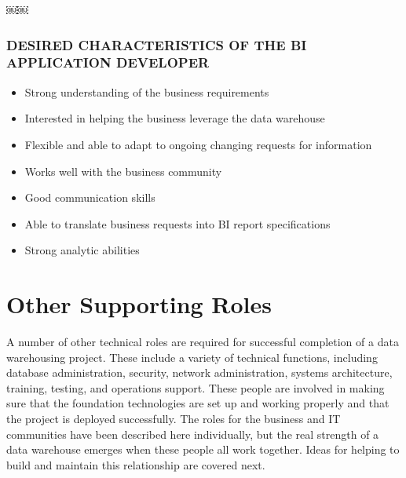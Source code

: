 \documentclass{vldb}
\newcommand{\bi}{\begin{itemize}}
\newcommand{\ei}{\end{itemize}}
\newcommand{\ii}{\item}
\begin{document}
￼￼\subsubsection*{DESIRED CHARACTERISTICS OF THE BI APPLICATION DEVELOPER}

\bi
\ii Strong understanding of the business requirements
\ii Interested in helping the business leverage the data warehouse
\ii Flexible and able to adapt to ongoing changing requests for information 
\ii Works well with the business community
\ii Good communication skills
\ii Able to translate business requests into BI report specifications
\ii Strong analytic abilities
\ei

\section{Other Supporting Roles}
A number of other technical roles are required for successful completion of a data warehousing project. These include a variety of technical functions, including database administration, security, network administration, systems architecture, training, testing, and operations support. These people are involved in making sure that the foundation technologies are set up and working properly and that the project is deployed successfully.
The roles for the business and IT communities have been described here individually, but the real strength of a data warehouse emerges when these people all work together. Ideas for helping to build and maintain this relationship are covered next.



\end{document}
